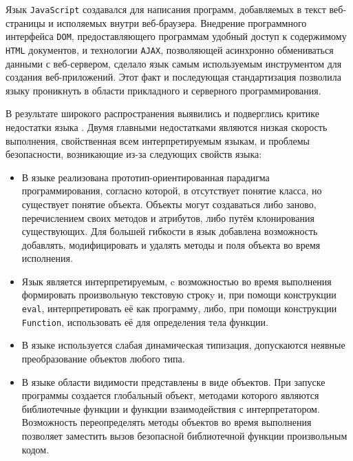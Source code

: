 
Язык \texttt{JavaScript} создавался для написания программ,
добавляемых в текст веб-страницы и исполяемых внутри веб-браузера.
Внедрение программного интерфейса \texttt{DOM}, предоставляющего
программам удобный доступ к содержимому \texttt{HTML} документов, и
технологии \texttt{AJAX}, позволяющей асинхронно обмениваться данными
с веб-сервером, сделало язык самым используемым инструментом для
создания веб-приложений. Этот факт и последующая стандартизация
позволила языку проникнуть в области прикладного и серверного
программирования.

В результате широкого распространения выявились и подверглись критике
недостатки языка \cite{Crockford2008}. Двумя главными недостатками
являются низкая скорость выполнения, свойственная всем
интерпретируемым языкам, и проблемы безопасности, возникающие из-за
следующих свойств языка:
\begin{itemize} 
  \item В языке реализована прототип-ориентированная парадигма
    программирования, согласно которой, в отсутствует понятие класса,
    но существует понятие объекта. Объекты могут создаваться либо
    заново, перечислением своих методов и атрибутов, либо путём
    клонирования существующих. Для большей гибкости в язык добавлена
    возможность добавлять, модифицировать и удалять методы и поля
    объекта во время исполнения.
  \item
    Язык является интерпретируемым, c возможностью во время выполнения
    формировать произвольную текстовую строкy и, при помощи
    конструкции \texttt{eval}, интерпретировать её как программу,
    либо, при помощи конструкции \texttt{Function}, использовать её
    для определения тела функции.  
  \item В языке используется слабая
    динамическая типизация, допускаются неявные преобразование
    объектов любого типа.  
  \item В языке области видимости
    представлены в виде объектов. При запуске программы создается
    глобальный объект, методами которого являются библиотечные функции
    и функции взаимодействия с интерпретатором. Возможность
    переопределять методы объектов во время выполнения позволяет
    заместить вызов безопасной библиотечной функции произвольным
    кодом.
\end{itemize}

